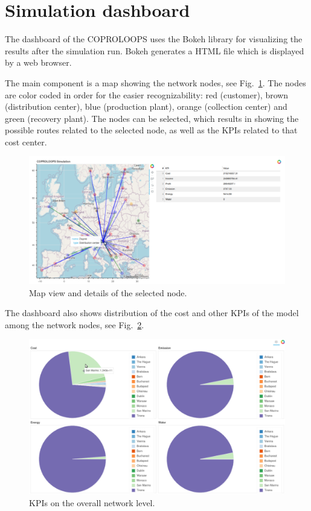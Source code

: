 \documentclass{article}
\newcommand{\NAME}{COPROLOOPS }
\begin{document}
\section{Simulation dashboard\label{sec:ui}}

The dashboard of the \NAME uses the Bokeh library for visualizing the results after the simulation run. Bokeh generates a HTML file which is displayed by a web browser.

The main component is a map showing the network nodes, see Fig.~\ref{fig:gui1}. The nodes are color coded in order for the easier recognizability: red (customer), brown (distribution center), blue (production plant), orange (collection center) and green (recovery plant). The nodes can be selected, which results in showing the possible routes related to the selected node, as well as the KPIs related to that cost center.

\begin{figure}[ht!]
	\center
	\includegraphics[width=\textwidth]{gui1.png} 
	\caption{Map view and details of the selected node.}\label{fig:gui1}
\end{figure}

The dashboard also shows distribution of the cost and other KPIs of the model among the network nodes, see Fig.~\ref{fig:gui2}.

\begin{figure}[ht!]
	\center
	\includegraphics[width=\textwidth]{gui2.png} 
	\caption{KPIs on the overall network level.}\label{fig:gui2}
\end{figure}
\end{document}
